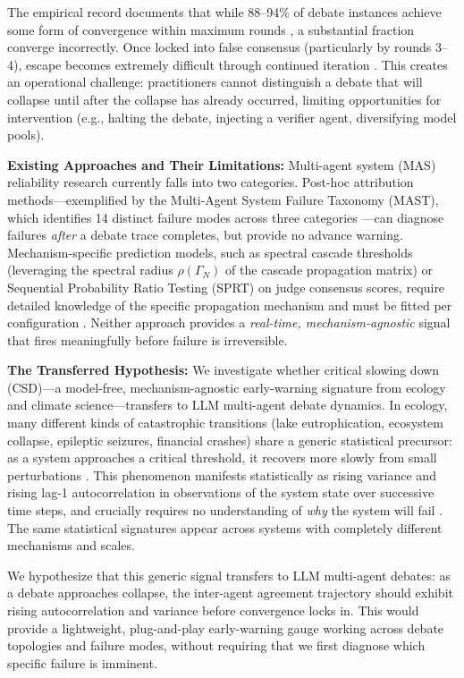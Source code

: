 \documentclass[11pt,letterpaper]{article}
\begin{document}
The empirical record documents that while 88--94\% of debate instances achieve some form of convergence within maximum rounds \citep{Wu2025,Marandi2026}, a substantial fraction converge incorrectly. Once locked into false consensus (particularly by rounds 3--4), escape becomes extremely difficult through continued iteration \citep{Xie2026}. This creates an operational challenge: practitioners cannot distinguish a debate that will collapse until after the collapse has already occurred, limiting opportunities for intervention (e.g., halting the debate, injecting a verifier agent, diversifying model pools).

\textbf{Existing Approaches and Their Limitations:} Multi-agent system (MAS) reliability research currently falls into two categories. Post-hoc attribution methods---exemplified by the Multi-Agent System Failure Taxonomy (MAST), which identifies 14 distinct failure modes across three categories \citep{Cemri2025}---can diagnose failures \emph{after} a debate trace completes, but provide no advance warning. Mechanism-specific prediction models, such as spectral cascade thresholds (leveraging the spectral radius $\rho(\Gamma_N)$ of the cascade propagation matrix) or Sequential Probability Ratio Testing (SPRT) on judge consensus scores, require detailed knowledge of the specific propagation mechanism and must be fitted per configuration \citep{Liu2026,Morandi2026}. Neither approach provides a \emph{real-time, mechanism-agnostic} signal that fires meaningfully before failure is irreversible.

\textbf{The Transferred Hypothesis:} We investigate whether critical slowing down (CSD)---a model-free, mechanism-agnostic early-warning signature from ecology and climate science---transfers to LLM multi-agent debate dynamics. In ecology, many different kinds of catastrophic transitions (lake eutrophication, ecosystem collapse, epileptic seizures, financial crashes) share a generic statistical precursor: as a system approaches a critical threshold, it recovers more slowly from small perturbations \citep{Scheffer2012}. This phenomenon manifests statistically as rising variance and rising lag-1 autocorrelation in observations of the system state over successive time steps, and crucially requires no understanding of \emph{why} the system will fail \citep{Scheffer2012,Dakos2012}. The same statistical signatures appear across systems with completely different mechanisms and scales.

We hypothesize that this generic signal transfers to LLM multi-agent debates: as a debate approaches collapse, the inter-agent agreement trajectory should exhibit rising autocorrelation and variance before convergence locks in. This would provide a lightweight, plug-and-play early-warning gauge working across debate topologies and failure modes, without requiring that we first diagnose which specific failure is imminent.
\end{document}
